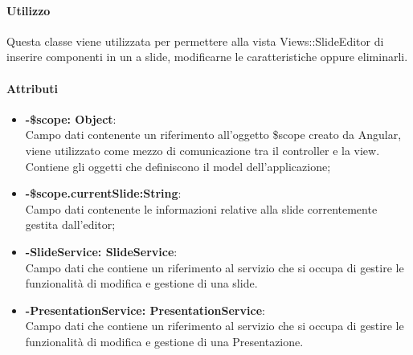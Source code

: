 	\paragraph{Utilizzo}
	Questa classe viene utilizzata per permettere alla vista Views::SlideEditor di inserire componenti in un a slide, modificarne le caratteristiche oppure eliminarli.\\
	\paragraph{Attributi}
	\begin{itemize}
		\item \textbf{-\$scope: Object}:\\
			Campo dati contenente un riferimento all'oggetto \$scope creato da Angular, viene utilizzato come mezzo di comunicazione tra il controller e la view. Contiene gli oggetti che definiscono il model dell'applicazione;
		\item \textbf{-\$scope.currentSlide:String}:\\
			Campo dati contenente le informazioni relative alla slide correntemente gestita dall'editor;
		\item \textbf{-SlideService: SlideService}:\\
			Campo dati che contiene un riferimento al servizio che si occupa di gestire le funzionalità di modifica e gestione di una slide.
		\item \textbf{-PresentationService: PresentationService}:\\
			Campo dati che contiene un riferimento al servizio che si occupa di gestire le funzionalità di modifica e gestione di una Presentazione.
	\end{itemize}


